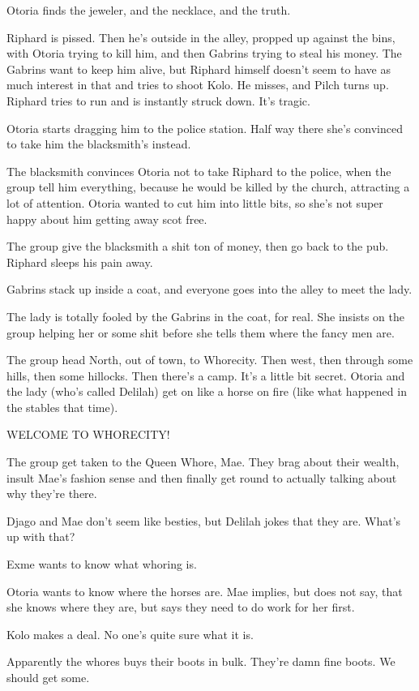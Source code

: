 \documentclass[letterpaper,10pt,twoside,twocolumn,openany]{book}
\begin{document}
Otoria finds the jeweler, and the necklace, and the truth.

Riphard is pissed. Then he’s outside in the alley, propped up against the bins, with Otoria trying to kill him, and then Gabrins trying to steal his money. The Gabrins want to keep him alive, but Riphard himself doesn’t seem to have as much interest in that and tries to shoot Kolo. He misses, and Pilch turns up. Riphard tries to run and is instantly struck down. It’s tragic.

Otoria starts dragging him to the police station. Half way there she’s convinced to take him the blacksmith’s instead.

The blacksmith convinces Otoria not to take Riphard to the police, when the group tell him everything, because he would be killed by the church, attracting a lot of attention. Otoria wanted to cut him into little bits, so she’s not super happy about him getting away scot free.

The group give the blacksmith a shit ton of money, then go back to the pub. Riphard sleeps his pain away.

Gabrins stack up inside a coat, and everyone goes into the alley to meet the lady.

The lady is totally fooled by the Gabrins in the coat, for real. She insists on the group helping her or some shit before she tells them where the fancy men are.

The group head North, out of town, to Whorecity. Then west, then through some hills, then some hillocks. Then there’s a camp. It’s a little bit secret. Otoria and the lady (who’s called Delilah) get on like a horse on fire (like what happened in the stables that time).

WELCOME TO WHORECITY!

The group get taken to the Queen Whore, Mae. They brag about their wealth, insult Mae’s fashion sense and then finally get round to actually talking about why they’re there.

Djago and Mae don’t seem like besties, but Delilah jokes that they are. What’s up with that?

Exme wants to know what whoring is.

Otoria wants to know where the horses are. Mae implies, but does not say, that she knows where they are, but says they need to do work for her first.

Kolo makes a deal. No one’s quite sure what it is.

Apparently the whores buys their boots in bulk. They’re damn fine boots. We should get some.
\end{document}
